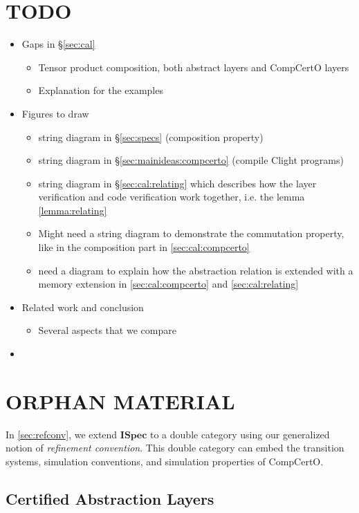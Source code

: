\documentclass[acmsmall,review,anonymous]{acmart}\settopmatter{printfolios=true,printccs=false,printacmref=false}
\newcommand{\ISpec}{\mathbf{ISpec}}
\begin{document}
\section{TODO}
\begin{itemize}
\item Gaps in \S\ref{sec:cal}
  \begin{itemize}
  \item Tensor product composition, both abstract layers
    and CompCertO layers
  \item Explanation for the examples
  \end{itemize}
\item Figures to draw
  \begin{itemize}
  \item string diagram in \S\ref{sec:specs} (composition property)
  \item string diagram in \S\ref{sec:mainideas:compcerto} (compile Clight programs)
  \item string diagram in \S\ref{sec:cal:relating}
    which describes how the layer verification and code verification
    work together, i.e. the lemma \ref{lemma:relating}
  \item Might need a string diagram to demonstrate
    the commutation property,
    like in the composition part in \ref{sec:cal:compcerto}
  \item need a diagram to explain how the abstraction relation
    is extended with a memory extension
    in \ref{sec:cal:compcerto} and \ref{sec:cal:relating}
  \end{itemize}
\item Related work and conclusion
  \begin{itemize}
  \item Several aspects that we compare
  \end{itemize}
\item 
\end{itemize}

\section*{ORPHAN MATERIAL} %

In \autoref{sec:refconv},
we extend $\ISpec$ to a double category
using our generalized notion of \emph{refinement convention}.
This double category can embed
the transition systems,
simulation conventions, and
simulation properties of CompCertO.

\subsection*{Certified Abstraction Layers}%
\end{document}
